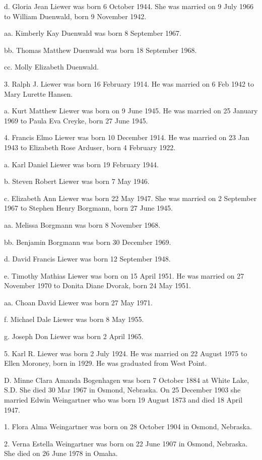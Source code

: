 \documentclass[a4paper]{article}
\begin{document}
d. Gloria Jean Liewer was born 6 October 1944.  She was married on 9 July 1966 to William Duenwald, born 9 November 1942.

aa. Kimberly Kay Duenwald was born 8 September 1967.

bb. Thomas Matthew Duenwald was born 18 September 1968.

cc. Molly Elizabeth Duenwald.

3. Ralph J. Liewer was born 16 February 1914.  He was married on 6 Feb 1942 to Mary Lurette Hansen.

a. Kurt Matthew Liewer was born on 9 June 1945.  He was married on 25 January 1969 to Paula Eva Creyke, born 27 June 1945.

4. Francis Elmo Liewer was born 10 December 1914.  He was married on 23 Jan 1943 to Elizabeth Rose Arduser, born 4 February 1922.

a. Karl Daniel Liewer was born 19 February 1944.

b. Steven Robert Liewer was born 7 May 1946.

c. Elizabeth Ann Liewer was born 22 May 1947.  She was married on 2 September 1967 to Stephen Henry Borgmann, born 27 June 1945.

aa. Melissa Borgmann was born 8 November 1968.

bb. Benjamin Borgmann was born 30 December 1969.

d. David Francis Liewer was born 12 September 1948.

e. Timothy Mathias Liewer was born on 15 April  1951.  He was married on 27 November 1970 to Donita Diane Dvorak, born 24 May 1951.
 
aa. Choan David Liewer was born 27 May 1971.

f. Michael Dale Liewer was born 8 May 1955.

g. Joseph Don Liewer was born 2 April 1965.

5. Karl R. Liewer was born 2 July 1924.  He was married on 22 August 1975 to Ellen Moroney, born in 1929.  He was graduated from West Point.    

D. Minne Clara Amanda Bogenhagen was born 7 October 1884 at White Lake, S.D.  She died 30 Mar 1967 in Osmond, Nebraska.  On 25 December 1903 she married Edwin Weingartner who was born 19 August 1873 and died 18 April 1947.

1. Flora Alma Weingartner was born on 28 October 1904 in Osmond, Nebraska.

2. Verna Estella Weingartner was born on 22 June 1907 in Osmond, Nebraska. She died on 26 June 1978 in Omaha.
\end{document}
